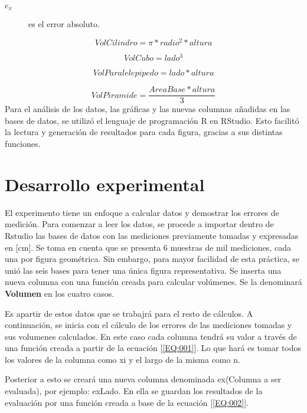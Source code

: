 \documentclass[%
 reprint,
groupedaddress,
unsortedaddress,
 amsmath,amssymb,
 aps,
superscriptaddress
]{revtex4-2}
\begin{document}
\begin{description}
	\item[$e_x$] es el error absoluto.
\end{description}
\begin{equation}\label{EQ:005}
	VolCilindro = \pi * radio^2 * altura
\end{equation}

\begin{equation}\label{EQ:006}
	VolCubo = lado^3
\end{equation}

\begin{equation}\label{EQ:007}
	VolParalelepipedo = lado * altura
\end{equation}

\begin{equation}\label{EQ:008}
	VolPiramide = \frac{AreaBase * altura}{3}
\end{equation}
Para el análisis de los datos, las gráficas y las nuevas columnas añadidas en las bases de datos, se utilizó el lenguaje de programación R en RStudio. Esto facilitó la lectura y generación de resultados para cada figura, gracias a sus distintas funciones.

\section{Desarrollo experimental}

El experimento tiene un enfoque a calcular datos y demostrar los errores de medición.
Para comenzar a leer los datos, se procede a importar dentro de Rstudio las bases de datos con las mediciones previamente tomadas y expresadas en [cm]. Se toma en cuenta que se presenta 6 muestras de mil mediciones, cada una por figura geométrica. Sin embargo, para mayor facilidad de esta práctica, se unió las seis bases para tener una única figura representativa.
Se inserta una nueva columna con una función creada para calcular volúmenes. Se la denominará \textbf{Volumen} en los cuatro casos.  


Es apartir de estos datos que se trabajrá para el resto de cálculos.
A continuación, se inicia con el cálculo de los errores de las mediciones tomadas y sus volumenes calculados. En este caso cada columna tendrá su valor a través de una función creada a partir de la ecuación [\ref{EQ:001}]. Lo que hará es tomar todos los valores de la columna como xi y el largo de la misma como n.  

Posterior a esto se creará una nueva columna denominada ex(Columna a ser evaluada), por ejemplo: exLado. En ella se guardan los resultados de la evaluación por una función creada a base de la ecuación [\ref{EQ:002}].
\end{document}
